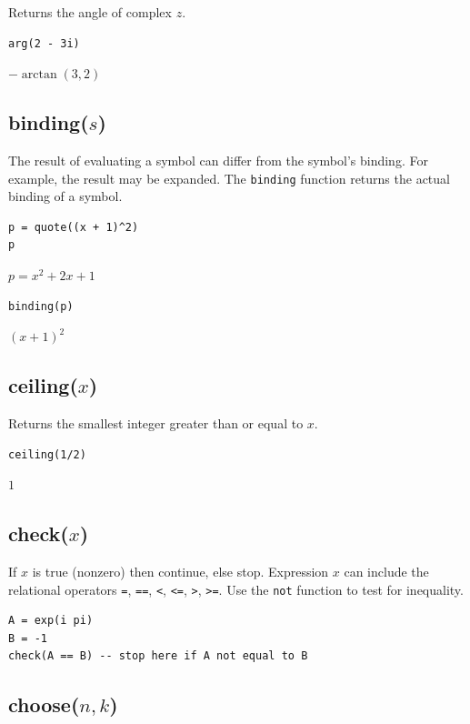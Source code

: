 \documentclass[12pt]{article}
\begin{document}
Returns the angle of complex $z$.

{\color{blue}
\begin{verbatim}
arg(2 - 3i)
\end{verbatim}
}

\noindent
$-\arctan(3,2)$

\subsection*{binding($s$)}

The result of evaluating a symbol can differ from the symbol's binding.
For example, the result may be expanded.
The {\tt binding} function returns the actual binding of a symbol.

{\color{blue}
\begin{verbatim}
p = quote((x + 1)^2)
p
\end{verbatim}
}

\noindent
$p=x^2+2x+1$

{\color{blue}
\begin{verbatim}
binding(p)
\end{verbatim}
}

\noindent
$(x+1)^2$

\subsection*{ceiling($x$)}

Returns the smallest integer greater than or equal to $x$.

{\color{blue}
\begin{verbatim}
ceiling(1/2)
\end{verbatim}
}

\noindent
$1$

\subsection*{check($x$)}

If $x$ is true (nonzero) then continue, else stop.
Expression $x$ can include the relational operators
\verb$=$,
\verb$==$,
\verb$<$,
\verb$<=$,
\verb$>$,
\verb$>=$.
Use the
\verb$not$
function to test for inequality.

{\color{blue}
\begin{verbatim}
A = exp(i pi)
B = -1
check(A == B) -- stop here if A not equal to B
\end{verbatim}
}

\subsection*{choose($n,k$)}
\end{document}
